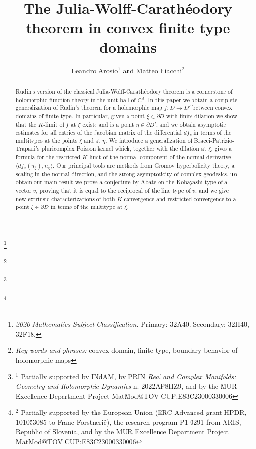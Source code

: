 \documentclass[11pt, reqno]{amsart}
\numberwithin{equation}{section}
\theoremstyle{definition}
\newcommand{\C}{\mathbb{C}}
\begin{document}
	
	\title{The Julia-Wolff-Carath\'eodory theorem in convex finite type domains}
	
	\author{Leandro Arosio$^1$ and Matteo Fiacchi$^2$}
	
	\address{Leandro Arosio,
		Dipartimento Di Matematica, Universit\`a di Roma \lq\lq Tor Vergata\rq\rq, Via Della Ricerca Scientifica 1, 00133 Roma, Italy}
\address{Matteo Fiacchi,
		Dipartimento Di Matematica, Universit\`a di Roma \lq\lq Tor Vergata\rq\rq, Via Della Ricerca Scientifica 1, 00133 Roma, Italy}
	
	\thanks{\textit{2020 Mathematics Subject Classification.}  Primary: 32A40. Secondary: 32H40, 32F18.}
	
	\thanks{\textit{Key words and phrases:} convex domain, finite type, boundary behavior of holomorphic maps}
	
	\thanks{${}^1$  Partially supported by   INdAM, by  PRIN {\sl  Real and Complex Manifolds: Geometry and Holomorphic Dynamics} n. 2022AP8HZ9, and by the MUR Excellence Department Project MatMod@TOV
		CUP:E83C23000330006}
	
	\thanks{${}^2$ Partially supported by the European Union (ERC Advanced grant HPDR, 101053085 to Franc Forstneri\v c), the research program P1-0291 from ARIS, Republic of Slovenia, and by the MUR Excellence Department Project MatMod@TOV CUP:E83C23000330006}
	\begin{abstract}
Rudin's version of the classical   Julia-Wolff-Carath\'eodory theorem is a cornerstone of holomorphic function theory in the unit ball of $\C^d$. 
In this paper we obtain a complete generalization of Rudin's  theorem  for a holomorphic map $f\colon D\to D'$ between   convex domains of finite type. In particular, given a point   $\xi\in \partial D$ with finite dilation we show that 
the $K$-limit  of $f$ at $\xi$ exists and is a point $\eta\in \partial D'$,
and we obtain asymptotic estimates for all entries of the Jacobian matrix of the differential $df_z$ in terms of the multitypes at the points  $\xi$ and at $\eta$. We  introduce a generalization  of Bracci-Patrizio-Trapani's pluricomplex Poisson kernel which, together with the dilation at $\xi$, gives a formula for the restricted $K$-limit of the normal component of the normal derivative
$\langle df_z(n_\xi),n_\eta\rangle$.
Our principal tools are methods from Gromov hyperbolicity theory,  a scaling in the normal direction, and the strong asymptoticity of complex geodesics.
To obtain our main result we prove a conjecture by Abate on the Kobayashi type of a vector $v$, proving that it is equal to the reciprocal of the line type of $v$, and we give new extrinsic characterizations of both  $K$-convergence and restricted  convergence to a point $\xi\in \partial D$ in terms of the multitype at $\xi$.
	\end{abstract}
	
\end{document}
